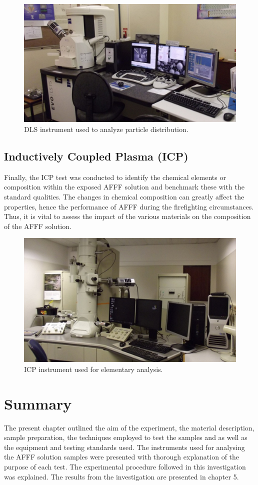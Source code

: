 \documentclass[12pt]{report}
\begin{document}
\begin{figure}[H]
    \includegraphics[width=.6\textwidth]{dls_instrument.png}
    \caption{DLS instrument used to analyze particle distribution.}
    \label{ch4:figure:dls}
\end{figure}

\subsection{Inductively Coupled Plasma (ICP)}
Finally, the ICP test was conducted to identify the chemical elements or composition within the exposed AFFF solution and benchmark these with the standard qualities. The changes in chemical composition can greatly affect the properties, hence the performance of AFFF during the firefighting circumstances. Thus, it is vital to assess the impact of the various materials on the composition of the AFFF solution. 
 
\begin{figure}[H]
    \includegraphics[width=.6\textwidth]{icp_instrument.png}
    \caption{ICP instrument used for elementary analysis.}
    \label{ch4:figure:icp}
\end{figure}

\section{Summary}
The present chapter outlined the aim of the experiment, the material description, sample preparation, the techniques employed to test the samples and as well as the equipment and testing standards used. The instruments used for analysing the AFFF solution samples were presented with thorough explanation of the purpose of each test. The experimental procedure followed in this investigation was explained. The results from the investigation are presented in chapter 5.
\end{document}
